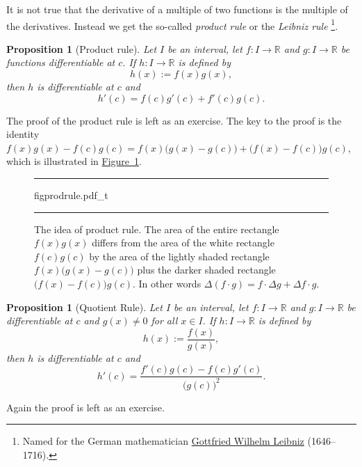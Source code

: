 \documentclass[12pt]{book}
\newenvironment{myfigureht}{%
\begin{figure}[h!t]
\noindent\rule{\textwidth}{0.4pt}\vspace{12pt}\par\centering}%
{\par\noindent\rule{\textwidth}{0.4pt}
\end{figure}}
\newcommand{\R}{{\mathbb{R}}}
\newcommand{\myindex}[1]{#1\index{#1}}
\theoremstyle{plain}
\newtheorem{prop}[thm]{Proposition}
\theoremstyle{remark}
\theoremstyle{definition}
\theoremstyle{exercise}
\theoremstyle{example}
\newcommand{\figureref}[1]{\hyperref[#1]{Figure~\ref*{#1}}}
\begin{document}
It is not true that the derivative of a multiple of two functions is
the multiple of the derivatives.  Instead we get the so-called \emph{product
rule} or the \emph{\myindex{Leibniz rule}}%
\footnote{Named for the German mathematician
\href{http://en.wikipedia.org/wiki/Leibniz}{Gottfried Wilhelm Leibniz}
(1646--1716).}.

\begin{prop}[Product rule]
Let $I$ be an interval, let
$f \colon I \to \R$ and $g \colon I \to \R$ be 
functions differentiable at $c$.  If $h \colon I \to \R$
is defined by
\begin{equation*}
h(x) := f(x) g(x) ,
\end{equation*}
then $h$ is differentiable at $c$ and
\begin{equation*}
h'(c) = f(c) g'(c) + f'(c) g(c) .
\end{equation*}
\end{prop}

The proof of the product rule is left as an exercise.  The key to the proof is 
the identity
$f(x) g(x) - f(c) g(c) =
f(x)\bigl( g(x) - g(c) \bigr)
+ \bigl( f(x) - f(c) \bigr) g(c)$,
which is illustrated in \figureref{figprodrule}.
\begin{myfigureht}
{figprodrule.pdf_t}
\caption{The idea of product rule.  The area of the entire rectangle
$f(x)g(x)$ differs from the area of the white rectangle $f(c)g(c)$
by the area of the lightly shaded rectangle
$f(x)\bigl( g(x) - g(c) \bigr)$ plus the darker shaded rectangle
$\bigl( f(x) - f(c) \bigr) g(c)$.
In other words $\Delta (f \cdot g)
= f \cdot \Delta g + \Delta f \cdot g$.\label{figprodrule}}
\end{myfigureht}



\begin{prop}[Quotient Rule]
Let $I$ be an interval, let
$f \colon I \to \R$ and $g \colon I \to \R$ be differentiable at $c$
and $g(x) \not= 0$ for all $x \in I$.
If $h \colon I \to \R$
is defined by
\begin{equation*}
h(x) := \frac{f(x)}{g(x)},
\end{equation*}
then $h$ is differentiable at $c$ and
\begin{equation*}
h'(c) = \frac{f'(c) g(c) - f(c) g'(c)}{{\bigl(g(c)\bigr)}^2} .
\end{equation*}
\end{prop}

Again the proof is left as an exercise.
\end{document}
